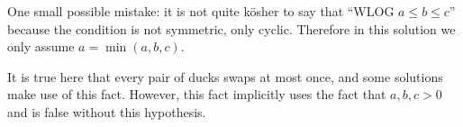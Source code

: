 \begin{remark*}
  One small possible mistake:
  it is not quite k\"{o}sher to say that ``WLOG $a \le b \le c$''
  because the condition is not symmetric, only cyclic.
  Therefore in this solution we only assume $a = \min(a,b,c)$.

  It is true here that every pair of ducks swaps at most once,
  and some solutions make use of this fact.
  However, this fact implicitly uses the fact that $a,b,c > 0$
  and is false without this hypothesis.
\end{remark*}
